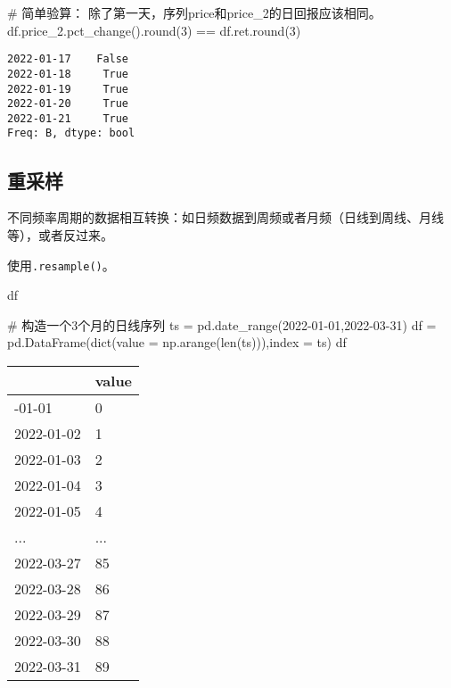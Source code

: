 \documentclass[
  letterpaper,
  DIV=11,
  numbers=noendperiod]{scrreprt}
\newenvironment{Shaded}{\begin{snugshade}}{\end{snugshade}}
\newcommand{\BuiltInTok}[1]{\textcolor[rgb]{0.00,0.23,0.31}{#1}}
\newcommand{\CommentTok}[1]{\textcolor[rgb]{0.37,0.37,0.37}{#1}}
\newcommand{\DecValTok}[1]{\textcolor[rgb]{0.68,0.00,0.00}{#1}}
\newcommand{\NormalTok}[1]{\textcolor[rgb]{0.00,0.23,0.31}{#1}}
\newcommand{\OperatorTok}[1]{\textcolor[rgb]{0.37,0.37,0.37}{#1}}
\newcommand{\StringTok}[1]{\textcolor[rgb]{0.13,0.47,0.30}{#1}}
\begin{document}
\begin{Shaded}
\begin{Highlighting}[]
\CommentTok{\# 简单验算： 除了第一天，序列price和price\_2的日回报应该相同。}
\NormalTok{df.price\_2.pct\_change().}\BuiltInTok{round}\NormalTok{(}\DecValTok{3}\NormalTok{) }\OperatorTok{==}\NormalTok{ df.ret.}\BuiltInTok{round}\NormalTok{(}\DecValTok{3}\NormalTok{)}
\end{Highlighting}
\end{Shaded}

\begin{verbatim}
2022-01-17    False
2022-01-18     True
2022-01-19     True
2022-01-20     True
2022-01-21     True
Freq: B, dtype: bool
\end{verbatim}

\hypertarget{ux91cdux91c7ux6837}{%
\subsection{重采样}\label{ux91cdux91c7ux6837}}

不同频率周期的数据相互转换：如日频数据到周频或者月频（日线到周线、月线等），或者反过来。

使用\texttt{.resample()}。

df

\begin{Shaded}
\begin{Highlighting}[]
\CommentTok{\# 构造一个3个月的日线序列}
\NormalTok{ts }\OperatorTok{=}\NormalTok{ pd.date\_range(}\StringTok{\textquotesingle{}2022{-}01{-}01\textquotesingle{}}\NormalTok{,}\StringTok{\textquotesingle{}2022{-}03{-}31\textquotesingle{}}\NormalTok{)}
\NormalTok{df }\OperatorTok{=}\NormalTok{ pd.DataFrame(}\BuiltInTok{dict}\NormalTok{(value }\OperatorTok{=}\NormalTok{ np.arange(}\BuiltInTok{len}\NormalTok{(ts))),index }\OperatorTok{=}\NormalTok{ ts)}
\NormalTok{df}
\end{Highlighting}
\end{Shaded}

\begin{longtable}[]{@{}ll@{}}
\toprule\noalign{}
& value \\
\midrule\noalign{}
\endhead
\bottomrule\noalign{}
\endlastfoot
2022-01-01 & 0 \\
2022-01-02 & 1 \\
2022-01-03 & 2 \\
2022-01-04 & 3 \\
2022-01-05 & 4 \\
... & ... \\
2022-03-27 & 85 \\
2022-03-28 & 86 \\
2022-03-29 & 87 \\
2022-03-30 & 88 \\
2022-03-31 & 89 \\
\end{longtable}
\end{document}
